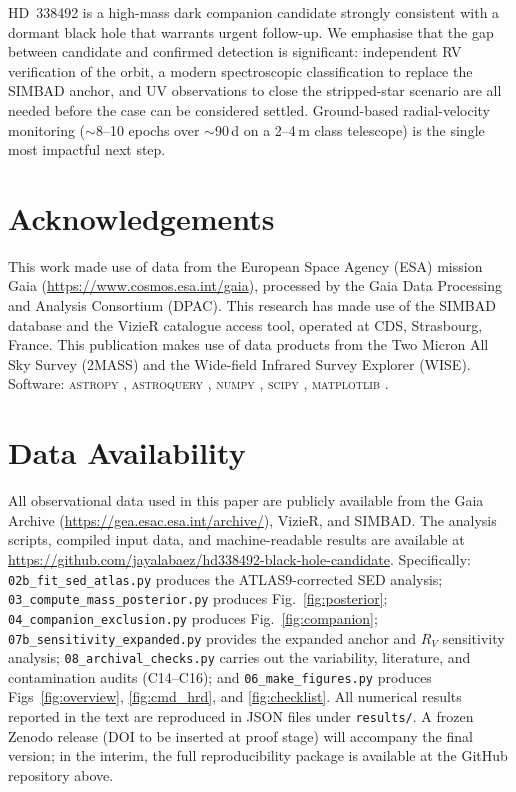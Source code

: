 \documentclass[usenatbib,fleqn]{mnras}
\begin{document}
HD~338492 is a high-mass dark companion candidate strongly consistent
with a dormant black hole that warrants urgent follow-up.  We emphasise that the gap between
candidate and confirmed detection is significant: independent
RV verification of the orbit, a modern spectroscopic
classification to replace the SIMBAD anchor, and UV observations
to close the stripped-star scenario are all needed before the
case can be considered settled.  Ground-based radial-velocity
monitoring ($\sim$8--10 epochs over $\sim$90\,d on a 2--4\,m
class telescope) is the single most impactful next step.

\section*{Acknowledgements}

This work made use of data from the European Space Agency (ESA)
mission Gaia (\url{https://www.cosmos.esa.int/gaia}), processed by
the Gaia Data Processing and Analysis Consortium (DPAC).
This research has made use of the SIMBAD database and the VizieR
catalogue access tool, operated at CDS, Strasbourg, France.
This publication makes use of data products from the Two Micron All
Sky Survey (2MASS) and the Wide-field Infrared Survey Explorer
(WISE).  Software: \textsc{astropy} \citep{Astropy2022},
\textsc{astroquery} \citep{Astroquery2019}, \textsc{numpy}
\citep{Harris2020}, \textsc{scipy} \citep{Virtanen2020},
\textsc{matplotlib} \citep{Hunter2007}.

\section*{Data Availability}

All observational data used in this paper are publicly available
from the Gaia Archive
(\url{https://gea.esac.esa.int/archive/}), VizieR, and SIMBAD.
The analysis scripts, compiled input data, and machine-readable
results are available at
\url{https://github.com/jayalabaez/hd338492-black-hole-candidate}.
Specifically: \texttt{02b\_fit\_sed\_atlas.py} produces
the ATLAS9-corrected SED analysis;
\texttt{03\_compute\_mass\_posterior.py}
produces Fig.~\ref{fig:posterior};
\texttt{04\_companion\_exclusion.py} produces
Fig.~\ref{fig:companion};
\texttt{07b\_sensitivity\_expanded.py} provides the expanded
anchor and $R_V$ sensitivity analysis;
\texttt{08\_archival\_checks.py} carries out the
variability, literature, and contamination audits (C14--C16);
and \texttt{06\_make\_figures.py}
produces Figs~\ref{fig:overview}, \ref{fig:cmd_hrd}, and
\ref{fig:checklist}.  All numerical results reported in the text
are reproduced in JSON files under \texttt{results/}.
A frozen Zenodo release (DOI to be inserted at proof stage) will
accompany the final version; in the interim, the full reproducibility
package is available at the GitHub repository above.
\end{document}
